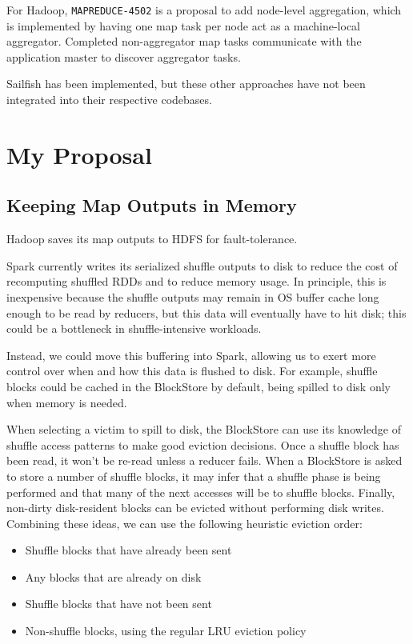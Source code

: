 \documentclass[12pt]{article}
\begin{document}
For Hadoop, \texttt{MAPREDUCE-4502} \cite{MR-4502} is a proposal to add
node-level aggregation, which is implemented by having one map task per node
act as a machine-local aggregator.  Completed non-aggregator map tasks
communicate with the application master to discover aggregator tasks.

Sailfish has been implemented, but these other approaches have not been
integrated into their respective codebases.

\section{My Proposal}

\subsection{Keeping Map Outputs in Memory}

Hadoop saves its map outputs to HDFS for fault-tolerance.

Spark currently writes its serialized shuffle outputs to disk to reduce the
cost of recomputing shuffled RDDs and to reduce memory usage.  In principle,
this is inexpensive because the shuffle outputs may remain in OS buffer cache
long enough to be read by reducers, but this data will eventually have to hit
disk; this could be a bottleneck in shuffle-intensive workloads.

Instead, we could move this buffering into Spark, allowing us to exert more
control over when and how this data is flushed to disk.  For example, shuffle
blocks could be cached in the BlockStore by default, being spilled to disk
only when memory is needed.

When selecting a victim to spill to disk, the BlockStore can use its knowledge
of shuffle access patterns to make good eviction decisions.  Once a shuffle
block has been read, it won't be re-read unless a reducer fails.  When
a BlockStore is asked to store a number of shuffle blocks, it may infer that
a shuffle phase is being performed and that many of the next accesses will be
to shuffle
blocks.  Finally, non-dirty disk-resident blocks can be evicted without
performing disk writes. Combining these ideas, we can use the following
heuristic eviction order:

\begin{itemize}
        \item Shuffle blocks that have already been sent
        \item Any blocks that are already on disk
        \item Shuffle blocks that have not been sent
        \item Non-shuffle blocks, using the regular LRU eviction policy
\end{itemize}
\end{document}
